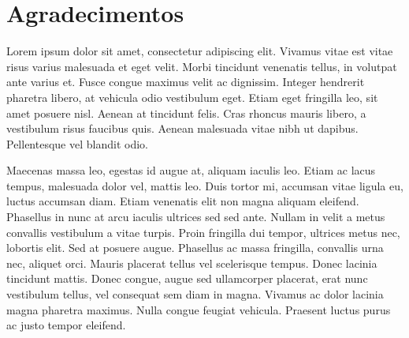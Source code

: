 \chapter*{Agradecimentos}

Lorem ipsum dolor sit amet, consectetur adipiscing elit. Vivamus vitae est vitae risus varius malesuada et eget velit. Morbi tincidunt venenatis tellus, in volutpat ante varius et. Fusce congue maximus velit ac dignissim. Integer hendrerit pharetra libero, at vehicula odio vestibulum eget. Etiam eget fringilla leo, sit amet posuere nisl. Aenean at tincidunt felis. Cras rhoncus mauris libero, a vestibulum risus faucibus quis. Aenean malesuada vitae nibh ut dapibus. Pellentesque vel blandit odio.

Maecenas massa leo, egestas id augue at, aliquam iaculis leo. Etiam ac lacus tempus, malesuada dolor vel, mattis leo. Duis tortor mi, accumsan vitae ligula eu, luctus accumsan diam. Etiam venenatis elit non magna aliquam eleifend. Phasellus in nunc at arcu iaculis ultrices sed sed ante. Nullam in velit a metus convallis vestibulum a vitae turpis. Proin fringilla dui tempor, ultrices metus nec, lobortis elit. Sed at posuere augue. Phasellus ac massa fringilla, convallis urna nec, aliquet orci. Mauris placerat tellus vel scelerisque tempus. Donec lacinia tincidunt mattis. Donec congue, augue sed ullamcorper placerat, erat nunc vestibulum tellus, vel consequat sem diam in magna. Vivamus ac dolor lacinia magna pharetra maximus. Nulla congue feugiat vehicula. Praesent luctus purus ac justo tempor eleifend.